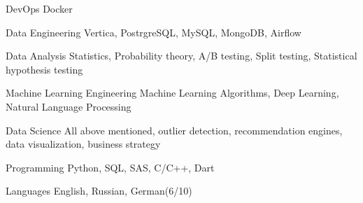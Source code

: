 

\begin{cvskills}

  \cvskill
    {DevOps} %
    {Docker} %

  \cvskill
    {Data Engineering} %
    {Vertica, PostrgreSQL, MySQL, MongoDB, Airflow} %

  \cvskill
    {Data Analysis} %
    {Statistics, Probability theory, A/B testing, Split testing, Statistical hypothesis testing} %

  \cvskill
    {Machine Learning Engineering} %
    {Machine Learning Algorithms, Deep Learning, Natural Language Processing} %

  \cvskill
    {Data Science} %
    {All above mentioned, outlier detection, recommendation engines, data visualization, business strategy} %

  \cvskill
    {Programming} %
    {Python, SQL, SAS, C/C++, Dart} %


  \cvskill
    {Languages} %
    {English, Russian, German(6/10)} %

\end{cvskills}
